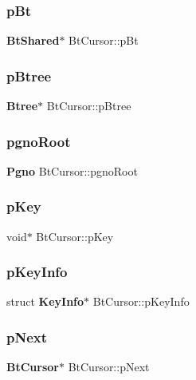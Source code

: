 \subsubsection{pBt}
{\footnotesize\ttfamily \textbf{ Bt\+Shared}$\ast$ Bt\+Cursor\+::p\+Bt}

\mbox{\label{struct_bt_cursor_a2ad810542eaf99c9919c585624bead6f}} 
\subsubsection{pBtree}
{\footnotesize\ttfamily \textbf{ Btree}$\ast$ Bt\+Cursor\+::p\+Btree}

\mbox{\label{struct_bt_cursor_a0b038f63a5b1b9df0b892e0773ffdd29}} 
\subsubsection{pgnoRoot}
{\footnotesize\ttfamily \textbf{ Pgno} Bt\+Cursor\+::pgno\+Root}

\mbox{\label{struct_bt_cursor_a3c979824f27f63678d7a2b02311bc330}} 
\subsubsection{pKey}
{\footnotesize\ttfamily void$\ast$ Bt\+Cursor\+::p\+Key}

\mbox{\label{struct_bt_cursor_ad2360bda13f959ed70672eb421fdb5ec}} 
\subsubsection{pKeyInfo}
{\footnotesize\ttfamily struct \textbf{ Key\+Info}$\ast$ Bt\+Cursor\+::p\+Key\+Info}

\mbox{\label{struct_bt_cursor_ad2f8fe3aa7d3fa3309692b3e8a8c2395}} 
\subsubsection{pNext}
{\footnotesize\ttfamily \textbf{ Bt\+Cursor}$\ast$ Bt\+Cursor\+::p\+Next}

\mbox{\label{struct_bt_cursor_ac2330fc36a0a3142bbab95dad4874a03}} 
